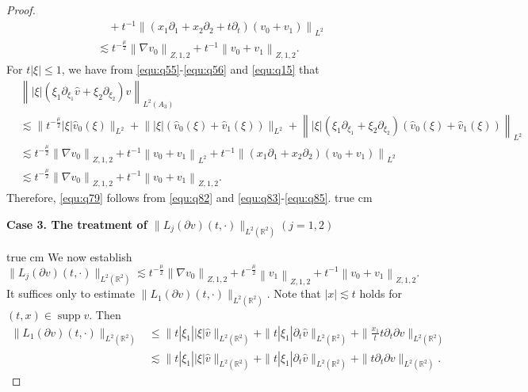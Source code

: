 \documentclass[10pt,a4paper]{amsart}
\newcommand{\R}{\mathbb R}
\newcommand{\f}{\frac}
\newcommand{\p}{\partial}
\begin{document}
\begin{proof}
\begin{equation}
\begin{aligned}
&\quad+ t^{-1}\left\|(x_1\p_1+x_2\p_2+t\p_t)(v_0+v_1)\right\|_{L^2}\\
&\lesssim t^{-\frac{\mu}{2}}\left\|\nabla v_{0}\right\|_{Z, 1, 2}+ t^{-1}\left\|v_0+v_1\right\|_{Z, 1, 2}.
\end{aligned}
\end{equation}
For  $t|\xi|\leq1$,  we have from \eqref{equ:q55}-\eqref{equ:q56} and \eqref{equ:q15} that
\begin{equation}\label{equ:q85}
\begin{aligned}
&\left\||\xi|(\xi_1\p_{\xi_1}\hat{v}+\xi_2\p_{\xi_2})\hat{v}\right\|_{L^2(A_3)}\\
&\lesssim \big\|t^{-\frac{\mu}{2}}|\xi|\hat{v}_{0}(\xi)\big\|_{L^{2}}+\big\||\xi|(\hat{v}_{0}(\xi)+\hat{v}_{1}(\xi))\big\|_{L^{2}}
+\left\||\xi|(\xi_1\p_{\xi_1}+\xi_2\p_{\xi_2})(\hat{v}_{0}(\xi)+\hat{v}_{1}(\xi))\right\|_{L^{2}}\\
&\lesssim  t^{-\frac{\mu}{2}}\left\|\nabla v_{0}\right\|_{Z, 1, 2}+ t^{-1}\left\|v_0+v_1\right\|_{L^2}+ t^{-1}\left\|(x_1\p_1+x_2\p_2)(v_0+v_1)\right\|_{L^2}\\
&\lesssim t^{-\frac{\mu}{2}}\left\|\nabla v_{0}\right\|_{Z, 1, 2}+ t^{-1}\left\|v_0+v_1\right\|_{Z, 1, 2}.
\end{aligned}
\end{equation}
Therefore, \eqref{equ:q79} follows from \eqref{equ:q82} and \eqref{equ:q83}-\eqref{equ:q85}.
 true cm

{\bf Case 3.  The treatment  of $\|L_j(\p v)(t, \cdot)\|_{L^2(\R^2)}(j=1, 2)$}

 true cm
We now establish
\begin{equation}\label{equ:q86}
\|L_j(\p v)(t, \cdot)\|_{L^2(\R^2)} \lesssim t^{-\f{\mu}{2}}\left\|\nabla v_0\right\|_{Z, 1, 2}
+t^{-\f{\mu}{2}}\left\|v_1\right\|_{Z, 1,2}+t^{-1}\left\|v_0+v_1\right\|_{Z, 1, 2}.
\end{equation}
It suffices only to estimate $\|L_1(\p v)(t, \cdot)\|_{L^2(\R^2)}$.
Note that $|x|\lesssim t$ holds for $(t, x)\in \operatorname{supp}v$. Then
\begin{equation}\label{equ:q87}
\begin{aligned}
\|L_1(\p v)(t, \cdot)\|_{L^2(\R^2)}
& \leq \|t|\xi_1||\xi|\hat{v}\|_{L^2(\R^2)}+\|t|\xi_1|\p_t\hat{v}\|_{L^2(\R^2)}+\|\f{x_1}{t}t\p_t\p v\|_{L^2(\R^2)}\\
& \lesssim \|t|\xi_1||\xi|\hat{v}\|_{L^2(\R^2)}+\|t|\xi_1|\p_t\hat{v}\|_{L^2(\R^2)}+\|t\p_t\p v\|_{L^2(\R^2)}.
\end{aligned}
\end{equation}


\end{proof}
\end{document}
